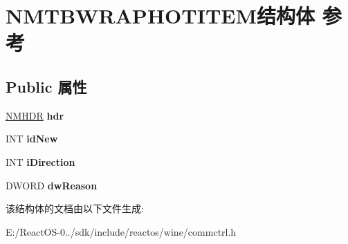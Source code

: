 \hypertarget{struct_n_m_t_b_w_r_a_p_h_o_t_i_t_e_m}{}\section{N\+M\+T\+B\+W\+R\+A\+P\+H\+O\+T\+I\+T\+E\+M结构体 参考}
\label{struct_n_m_t_b_w_r_a_p_h_o_t_i_t_e_m}
\subsection*{Public 属性}
\begin{DoxyCompactItemize}
\item 
\mbox{\label{struct_n_m_t_b_w_r_a_p_h_o_t_i_t_e_m_a3a85681e96162742578fcf44b44e7808}} 
\hyperlink{structtag_n_m_h_d_r}{N\+M\+H\+DR} {\bfseries hdr}
\item 
\mbox{\label{struct_n_m_t_b_w_r_a_p_h_o_t_i_t_e_m_a2092df6fb31892914b3e26e22aa5ad21}} 
I\+NT {\bfseries id\+New}
\item 
\mbox{\label{struct_n_m_t_b_w_r_a_p_h_o_t_i_t_e_m_a69c6177e076b45d76e474b78aec51ddf}} 
I\+NT {\bfseries i\+Direction}
\item 
\mbox{\label{struct_n_m_t_b_w_r_a_p_h_o_t_i_t_e_m_a61b2d29146b89c3e79c66fab256c0884}} 
D\+W\+O\+RD {\bfseries dw\+Reason}
\end{DoxyCompactItemize}


该结构体的文档由以下文件生成\+:\begin{DoxyCompactItemize}
\item 
E\+:/\+React\+O\+S-\/0../sdk/include/reactos/wine/commctrl.\+h\end{DoxyCompactItemize}
